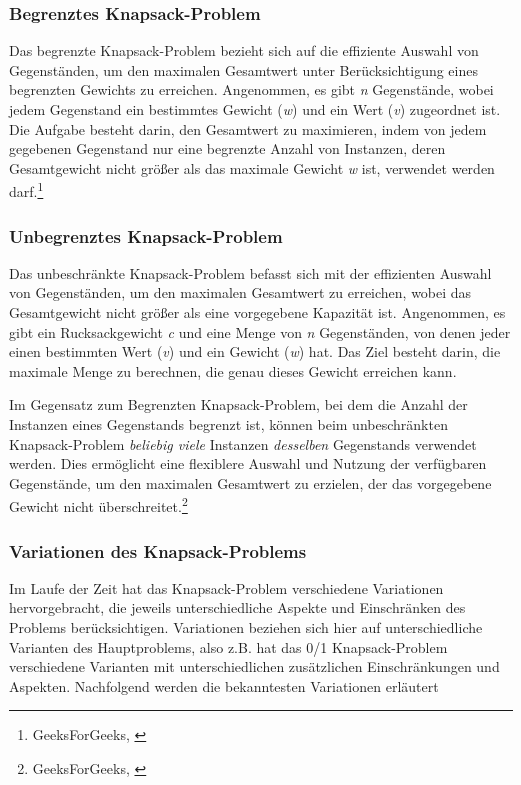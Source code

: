 \subsubsection*{Begrenztes Knapsack-Problem}
Das begrenzte Knapsack-Problem bezieht sich auf die effiziente Auswahl von Gegenständen, um den maximalen Gesamtwert
unter Berücksichtigung eines begrenzten Gewichts zu erreichen. Angenommen, es gibt \textit{n} Gegenstände, wobei jedem
Gegenstand ein bestimmtes Gewicht (\textit{w}) und ein Wert (\textit{v}) zugeordnet ist. Die Aufgabe besteht darin, den
Gesamtwert zu maximieren, indem von jedem gegebenen Gegenstand nur eine begrenzte Anzahl von Instanzen, deren Gesamtgewicht
nicht größer als das maximale Gewicht \textit{w} ist, verwendet werden darf.\footnote{GeeksForGeeks, \cite{Bounded Knapsack Problem}}

\subsubsection*{Unbegrenztes Knapsack-Problem}
Das unbeschränkte Knapsack-Problem befasst sich mit der effizienten Auswahl von Gegenständen, um den maximalen Gesamtwert
zu erreichen, wobei das Gesamtgewicht nicht größer als eine vorgegebene Kapazität ist. Angenommen, es gibt ein Rucksackgewicht
\textit{c} und eine Menge von \textit{n} Gegenständen, von denen jeder einen bestimmten Wert (\textit{v}) und ein
Gewicht (\textit{w}) hat. Das Ziel besteht darin, die maximale Menge zu berechnen, die genau dieses Gewicht erreichen kann.

Im Gegensatz zum Begrenzten Knapsack-Problem, bei dem die Anzahl der Instanzen eines Gegenstands begrenzt ist, können
beim unbeschränkten Knapsack-Problem \textit{beliebig viele} Instanzen \textit{desselben} Gegenstands verwendet werden.
Dies ermöglicht eine flexiblere Auswahl und Nutzung der verfügbaren Gegenstände, um den maximalen Gesamtwert zu erzielen,
der das vorgegebene Gewicht nicht überschreitet.\footnote{GeeksForGeeks, \cite{Unbounded Knapsack}}

\subsubsection{Variationen des Knapsack-Problems}
Im Laufe der Zeit hat das Knapsack-Problem verschiedene Variationen hervorgebracht, die jeweils unterschiedliche Aspekte
und Einschränken des Problems berücksichtigen. Variationen beziehen sich hier auf unterschiedliche Varianten des Hauptproblems,
also z.B. hat das 0/1 Knapsack-Problem verschiedene Varianten mit unterschiedlichen zusätzlichen Einschränkungen und
Aspekten. Nachfolgend werden die bekanntesten Variationen erläutert

